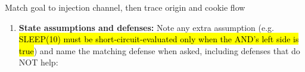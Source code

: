 \documentclass[12pt, a4paper]{article}
\newcommand{\imp}[1]{\hl{#1}}                       %
\begin{document}
\begin{schemebox}{Match goal to injection channel, then trace origin and cookie flow}
\begin{enumerate}[label=\textbf{Step \arabic*:}, leftmargin=*]
    \item \textbf{State assumptions and defenses:} Note any extra assumption (e.g. \imp{SLEEP(10) must be short-circuit-evaluated only when the AND's left side is true}) and name the matching defense when asked, including defenses that do NOT help:
\end{enumerate}
\end{schemebox}
\end{document}
